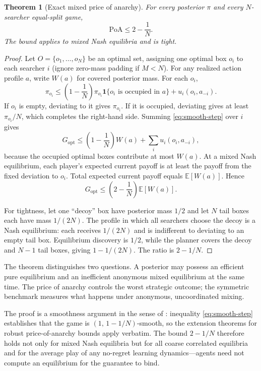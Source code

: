 \documentclass[11pt]{article}
\newtheorem{theorem}{Theorem}
\theoremstyle{definition}
\theoremstyle{remark}
\newcommand{\E}{\mathbb{E}}
\newcommand{\1}{\mathbf{1}}
\newcommand{\opt}{\mathrm{opt}}
\newcommand{\PoA}{\mathrm{PoA}}
\begin{document}
\begin{theorem}[Exact mixed price of anarchy]
\label{thm:poa}
For every posterior $\pi$ and every $N$-searcher equal-split game,
\begin{equation}
\PoA\le 2-\frac{1}{N}.
\label{eq:poa}
\end{equation}
The bound applies to mixed Nash equilibria and is tight.
\end{theorem}

\begin{proof}
Let $O=\{o_1,\ldots,o_N\}$ be an optimal set, assigning one optimal box $o_i$ to each searcher $i$ (ignore zero-mass padding if $M<N$). For any realized action profile $a$, write $W(a)$ for covered posterior mass. For each $o_i$,
\begin{equation}
\pi_{o_i}
\le \left(1-\frac{1}{N}\right)\pi_{o_i}\1\{o_i\text{ is occupied in }a\}
+u_i(o_i,a_{-i}).
\label{eq:smooth-step}
\end{equation}
If $o_i$ is empty, deviating to it gives $\pi_{o_i}$. If it is occupied, deviating gives at least $\pi_{o_i}/N$, which completes the right-hand side. Summing \cref{eq:smooth-step} over $i$ gives
\[
G_{\opt}\le\left(1-\frac{1}{N}\right)W(a)+\sum_i u_i(o_i,a_{-i}),
\]
because the occupied optimal boxes contribute at most $W(a)$. At a mixed Nash equilibrium, each player's expected current payoff is at least the payoff from the fixed deviation to $o_i$. Total expected current payoff equals $\E[W(a)]$. Hence
\[
G_{\opt}\le\left(2-\frac{1}{N}\right)\E[W(a)].
\]

For tightness, let one ``decoy'' box have posterior mass $1/2$ and let $N$ tail boxes each have mass $1/(2N)$. The profile in which all searchers choose the decoy is a Nash equilibrium: each receives $1/(2N)$ and is indifferent to deviating to an empty tail box. Equilibrium discovery is $1/2$, while the planner covers the decoy and $N-1$ tail boxes, giving $1-1/(2N)$. The ratio is $2-1/N$.
\end{proof}

The theorem distinguishes two questions. A posterior may possess an efficient pure equilibrium and an inefficient anonymous mixed equilibrium at the same time. The price of anarchy controls the worst strategic outcome; the symmetric benchmark measures what happens under anonymous, uncoordinated mixing.

The proof is a smoothness argument in the sense of \citet{Roughgarden2015}: inequality \cref{eq:smooth-step} establishes that the game is $(1,\,1-1/N)$-smooth, so the extension theorems for robust price-of-anarchy bounds apply verbatim. The bound $2-1/N$ therefore holds not only for mixed Nash equilibria but for all coarse correlated equilibria and for the average play of any no-regret learning dynamics---agents need not compute an equilibrium for the guarantee to bind.
\end{document}
